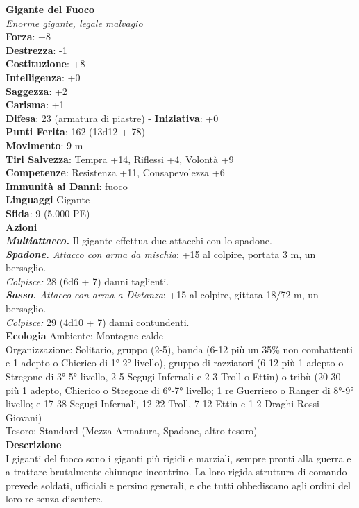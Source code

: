 \begin{multicols}{2}
\medskip\textbf{Gigante del Fuoco}\\
\emph{Enorme gigante, legale malvagio}\\
\textbf{Forza}: +8\\
\textbf{Destrezza}: -1\\
\textbf{Costituzione}: +8\\
\textbf{Intelligenza}: +0\\
\textbf{Saggezza}: +2\\
\textbf{Carisma}: +1\\
\textbf{Difesa}: 23 (armatura di piastre) - \textbf{Iniziativa}: +0\\
\textbf{Punti Ferita}: 162 (13d12 + 78)\\
\textbf{Movimento}: 9 m\\
\textbf{Tiri Salvezza}: Tempra +14, Riflessi +4, Volontà +9\\
\textbf{Competenze}: Resistenza +11, Consapevolezza +6\\
\textbf{Immunità ai Danni}: fuoco\\
\textbf{Linguaggi} Gigante\\
\textbf{Sfida}: 9 (5.000 PE)\smallskip\\
\smallskip\textbf{Azioni}\\
\emph{\textbf{Multiattacco.}} Il gigante effettua due attacchi con lo spadone.\\
\emph{\textbf{Spadone.} Attacco con arma da mischia}: +15 al colpire, portata 3 m, un bersaglio.\\
\emph{Colpisce:} 28 (6d6 + 7) danni taglienti.\\
\emph{\textbf{Sasso.} Attacco con arma a Distanza}: +15 al colpire, gittata 18/72 m, un bersaglio.\\
\emph{Colpisce:} 29 (4d10 + 7) danni contundenti. \\
\textbf{Ecologia}
Ambiente: Montagne calde\\
Organizzazione: Solitario, gruppo (2-5), banda (6-12 più un 35\% non combattenti e 1 adepto o Chierico di 1°-2° livello), gruppo di razziatori (6-12 più 1 adepto o Stregone di 3°-5° livello, 2-5 Segugi Infernali e 2-3 Troll o Ettin) o tribù (20-30 più 1 adepto, Chierico o Stregone di 6°-7° livello; 1 re Guerriero o Ranger di 8°-9° livello; e 17-38 Segugi Infernali, 12-22 Troll, 7-12 Ettin e 1-2 Draghi Rossi Giovani)\\
Tesoro: Standard (Mezza Armatura, Spadone, altro tesoro)\\
\textbf{Descrizione}\\
I giganti del fuoco sono i giganti più rigidi e marziali, sempre pronti alla guerra e a trattare brutalmente chiunque incontrino. La loro rigida struttura di comando prevede soldati, ufficiali e persino generali, e che tutti obbediscano agli ordini del loro re senza discutere.\\


\end{multicols}
